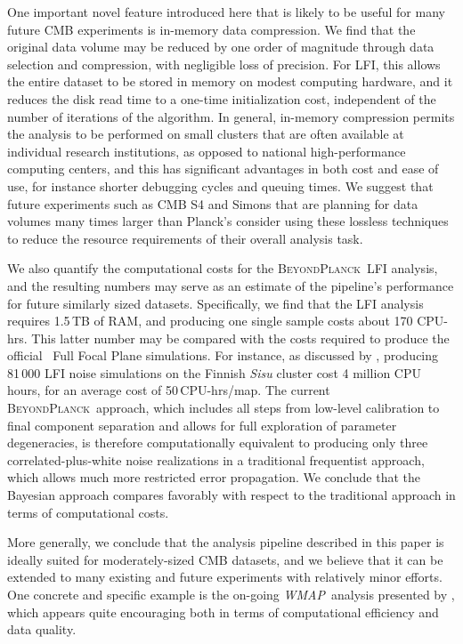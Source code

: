 \documentclass[twocolumn]{aa}
\def\WMAP{\emph{WMAP}}
\newcommand{\BP}{\textsc{BeyondPlanck}}
\begin{document}
One important novel feature introduced here that is likely to be
useful for many future CMB experiments is in-memory data
compression. We find that the original data volume may be reduced by
one order of magnitude through data selection and compression, with
negligible loss of precision. For LFI, this allows the entire dataset
to be stored in memory on modest computing hardware, and it reduces
the disk read time to a one-time initialization cost, independent of
the number of iterations of the algorithm. In general, in-memory
compression permits the analysis to be performed on small clusters
that are often available at individual research institutions, as
opposed to national high-performance computing centers, and this has
significant advantages in both cost and ease of use, for instance
shorter debugging cycles and queuing times. We suggest that future
experiments such as CMB S4 and Simons that are planning for data
volumes many times larger than Planck's consider using these lossless
techniques to reduce the resource requirements of their overall
analysis task.

We also quantify the computational costs for the \BP\ LFI analysis,
and the resulting numbers may serve as an estimate of the pipeline's
performance for future similarly sized datasets. Specifically, we find
that the LFI analysis requires 1.5\,TB of RAM, and producing one
single sample costs about 170 CPU-hrs. This latter number may be
compared with the costs required to produce the official \Planck\ Full
Focal Plane simulations. For instance, as discussed by
\citet{planck2014-a14}, producing 81\,000 LFI noise simulations on the
Finnish \emph{Sisu} cluster cost 4 million CPU hours, for an average
cost of 50\,CPU-hrs/map. The current \BP\ approach, which includes all
steps from low-level calibration to final component separation and
allows for full exploration of parameter degeneracies, is therefore
computationally equivalent to producing only three
correlated-plus-white noise realizations in a traditional frequentist
approach, which allows much more restricted error propagation. We
conclude that the Bayesian approach compares favorably with respect to
the traditional approach in terms of computational costs.

More generally, we conclude that the analysis pipeline described in
this paper is ideally suited for moderately-sized CMB datasets, and we
believe that it can be extended to many existing and future
experiments with relatively minor efforts. One concrete and specific
example is the on-going \WMAP\ analysis presented by \citet{BP17},
which appears quite encouraging both in terms of computational
efficiency and data quality.
\end{document}
